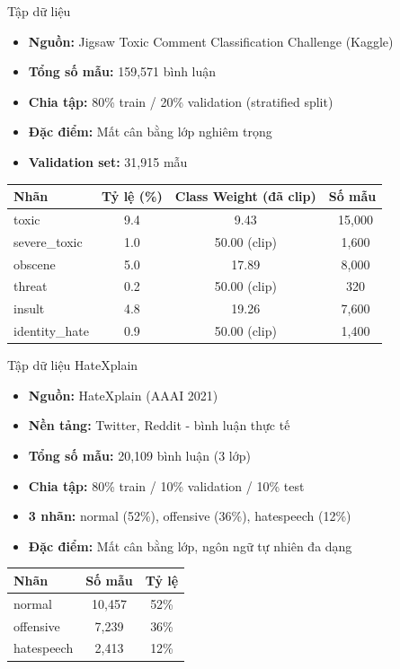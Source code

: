 \documentclass[serif, aspectratio=169]{beamer}
\begin{document}
\begin{frame}{Tập dữ liệu}
\begin{itemize}
    \item \textbf{Nguồn:} Jigsaw Toxic Comment Classification Challenge (Kaggle)
    \item \textbf{Tổng số mẫu:} 159,571 bình luận
    \item \textbf{Chia tập:} 80\% train / 20\% validation (stratified split)
    \item \textbf{Đặc điểm:} Mất cân bằng lớp nghiêm trọng
    \item \textbf{Validation set:} 31,915 mẫu
\end{itemize}
\vspace{0.3cm}
\begin{table}
\centering
\small
\begin{tabular}{lccc}
\toprule
Nhãn & Tỷ lệ (\%) & Class Weight (đã clip) & Số mẫu \\
\midrule
toxic & 9.4 & 9.43 & ~15,000 \\
severe\_toxic & 1.0 & 50.00 (clip) & ~1,600 \\
obscene & 5.0 & 17.89 & ~8,000 \\
threat & 0.2 & 50.00 (clip) & ~320 \\
insult & 4.8 & 19.26 & ~7,600 \\
identity\_hate & 0.9 & 50.00 (clip) & ~1,400 \\
\bottomrule
\end{tabular}
\end{table}
\end{frame}

\begin{frame}{Tập dữ liệu HateXplain}
\begin{itemize}
    \item \textbf{Nguồn:} HateXplain (AAAI 2021)
    \item \textbf{Nền tảng:} Twitter, Reddit - bình luận thực tế
    \item \textbf{Tổng số mẫu:} 20,109 bình luận (3 lớp)
    \item \textbf{Chia tập:} 80\% train / 10\% validation / 10\% test
    \item \textbf{3 nhãn:} normal (52\%), offensive (36\%), hatespeech (12\%)
    \item \textbf{Đặc điểm:} Mất cân bằng lớp, ngôn ngữ tự nhiên đa dạng
\end{itemize}
\vspace{0.2cm}
\begin{table}
\centering
\small
\begin{tabular}{lcc}
\toprule
Nhãn & Số mẫu & Tỷ lệ \\
\midrule
normal & 10,457 & 52\% \\
offensive & 7,239 & 36\% \\
hatespeech & 2,413 & 12\% \\
\bottomrule
\end{tabular}
\end{table}
\end{frame}
\end{document}
